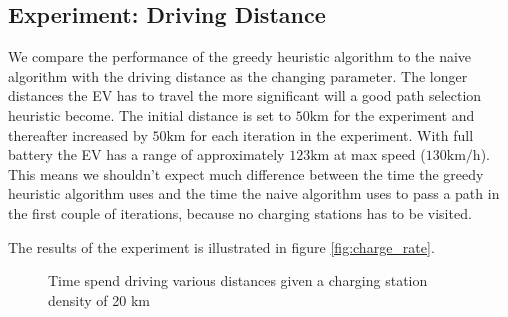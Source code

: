 \subsection{Experiment: Driving Distance}

We compare the performance of the greedy heuristic algorithm to the naive algorithm with the driving distance as the changing parameter. The longer distances the EV has to travel the more significant will a good path selection heuristic become. The initial distance is set to $50 \si{\km}$ for the experiment and thereafter increased by $50 \si{\km}$ for each iteration in the experiment. With full battery the EV has a range of approximately $123 \si{\km}$ at max speed ($130 \si{\km\per\hour}$). This means we shouldn't expect much difference between the time the greedy heuristic algorithm uses and the time the naive algorithm uses to pass a path in the first couple of iterations, because no charging stations has to be visited.

The results of the experiment is illustrated in figure \ref{fig:charge_rate}.  

\begin{figure}
\centering
{}
\caption{Time spend driving various distances given a charging station density of 20 km} 
\label{fig:driving_dist}
\end{figure}